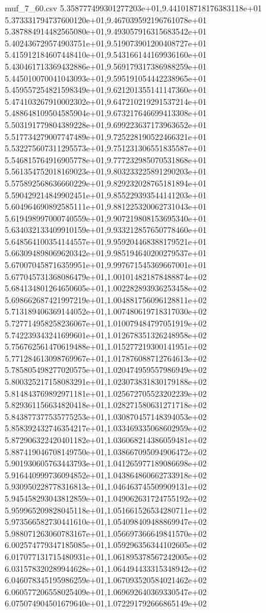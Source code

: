 \begin{filecontents*}{muf_7_60.csv}
5.358777499301277203e+01,9.441018718176383118e+01
5.373331794737600120e+01,9.467039592196761078e+01
5.387884914482565080e+01,9.493057916315683542e+01
5.402436729574903751e+01,9.519073901200408727e+01
5.415912184607448410e+01,9.543166144169936160e+01
5.430461713369432886e+01,9.569179317386988259e+01
5.445010070041043093e+01,9.595191054442238965e+01
5.459557254821598349e+01,9.621201355141147360e+01
5.474103267910002302e+01,9.647210219291537214e+01
5.488648109504585904e+01,9.673217646699413308e+01
5.503191779804389228e+01,9.699223637173963652e+01
5.517734279007747489e+01,9.725228190522466321e+01
5.532275607311295573e+01,9.751231306551835587e+01
5.546815764916905778e+01,9.777232985070531868e+01
5.561354752018169023e+01,9.803233225891290203e+01
5.575892568636660229e+01,9.829232028765181894e+01
5.590429214849902451e+01,9.855229393544141203e+01
5.604964690892585111e+01,9.881225320062731043e+01
5.619498997000740559e+01,9.907219808153695340e+01
5.634032133409910159e+01,9.933212857650778460e+01
5.648564100354144557e+01,9.959204468388179521e+01
5.663094898069620342e+01,9.985194640200279537e+01
5.670070458716359951e+01,9.997671545369667001e+01
5.677045731368086479e+01,1.001014821878488874e+02
5.684134801264650605e+01,1.002282893936253458e+02
5.698662687421997219e+01,1.004881756096128811e+02
5.713189406369144052e+01,1.007480619718317030e+02
5.727714958258236067e+01,1.010079484797051919e+02
5.742239343241699601e+01,1.012678351326248958e+02
5.756762561470619488e+01,1.015277219300141951e+02
5.771284613098769967e+01,1.017876088712764613e+02
5.785805498277020575e+01,1.020474959557986949e+02
5.800325217158083291e+01,1.023073831830179188e+02
5.814843769892971181e+01,1.025672705523202239e+02
5.829361156634820418e+01,1.028271580631271718e+02
5.843877377535775253e+01,1.030870457148394053e+02
5.858392432746354217e+01,1.033469335068602959e+02
5.872906322420401182e+01,1.036068214386059481e+02
5.887419046708149750e+01,1.038667095094906472e+02
5.901930605763443793e+01,1.041265977189086698e+02
5.916440999736094852e+01,1.043864860662733918e+02
5.930950228778316813e+01,1.046463745509909131e+02
5.945458293043812859e+01,1.049062631724755192e+02
5.959965209828045118e+01,1.051661526534280711e+02
5.973566582730441610e+01,1.054098409488869947e+02
5.988071263060783167e+01,1.056697366649841570e+02
6.002574779347185085e+01,1.059296356344102605e+02
6.017077131715480931e+01,1.061895378567242005e+02
6.031578320289944628e+01,1.064494433315348942e+02
6.046078345195986259e+01,1.067093520584021462e+02
6.060577206558025409e+01,1.069692640369330547e+02
6.075074904501679640e+01,1.072291792666865149e+02

\end{filecontents*}
